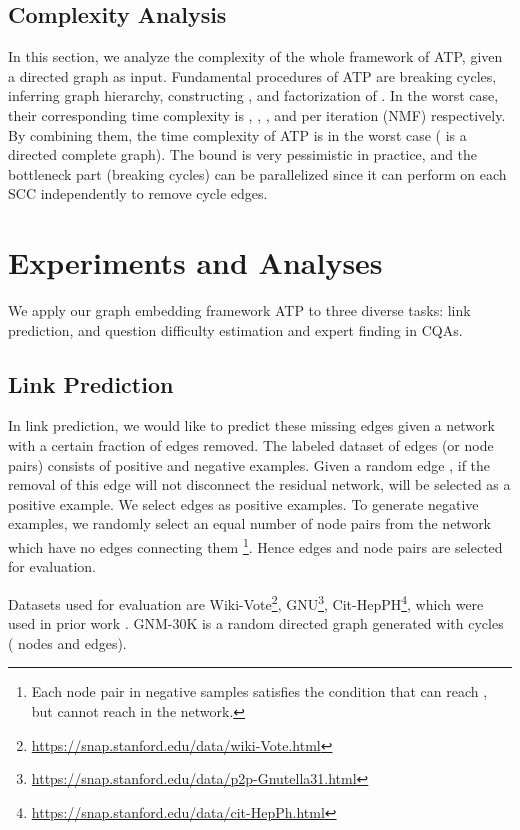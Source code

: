 \documentclass[letterpaper]{article} \usepackage{aaai19}  \usepackage{times}  \usepackage{helvet}  \usepackage{courier}  \usepackage{url}  \usepackage{graphicx}  \usepackage{booktabs} \usepackage{xcolor}
\begin{document}
\subsection{Complexity Analysis}
\label{sec:complexityAnalysis}

In this section, we analyze the complexity of the whole framework of ATP, given a directed graph  as input. Fundamental procedures of ATP are breaking cycles, inferring graph hierarchy, constructing , and factorization of . In the worst case, their corresponding time complexity is , , , and  per iteration (NMF) respectively. By combining them, the time complexity of ATP is  in the worst case ( is a directed complete graph). The bound is very pessimistic in practice, and the bottleneck part (breaking cycles) can be parallelized since it can perform on each SCC independently to remove cycle edges. 



\section{Experiments and Analyses}
\label{sec:experiments}

We apply our graph embedding framework ATP to three diverse tasks: link prediction, and  question difficulty estimation and expert finding in CQAs.

\subsection{Link Prediction}
\label{sec:link_prediction}

In link prediction, we would like to predict these missing edges given a network with a certain fraction of edges removed. 
The labeled dataset of edges (or node pairs) consists of positive and negative examples. Given a random edge , if the removal of this edge will not disconnect the residual network,  will be selected as a positive example. We select  edges as positive examples. To generate negative examples, we randomly select an equal number of node pairs from the network which have no edges connecting them \footnote{Each node pair  in negative samples satisfies the condition that  can reach , but  cannot reach  in the network.}. Hence  edges and node pairs are selected for evaluation.



Datasets used for evaluation are Wiki-Vote\footnote{\url{https://snap.stanford.edu/data/wiki-Vote.html}}, GNU\footnote{\url{https://snap.stanford.edu/data/p2p-Gnutella31.html}},  Cit-HepPH\footnote{\url{https://snap.stanford.edu/data/cit-HepPh.html}}, which were used in prior work \cite{Lai2017Prune}. GNM-30K is a random directed graph generated with cycles ( nodes and  edges).
\end{document}
